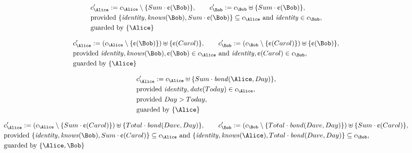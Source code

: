 \begin{align*}
&
c'_
{
\Alice
}
 := 
c_
{
\Alice
}
 \setminus 
\{
Sum
\cdot
\text{\textcent}
(
\Bob
)
\}
, \qquad 
c'_
{
\Bob
}
 := 
c_
{
\Bob
}
 \uplus 
\{
Sum
\cdot
\text{\textcent}
(
\Bob
)
\}
,\\
&
\text{provided } 
\{
\mathit{
identity
}
,
\mathit{
knows
}
(
\Bob
)
,
Sum
\cdot
\text{\textcent}
(
\Bob
)
\}
 \subseteq c_
{
\Alice
}
 \text{ and } 
\mathit{
identity
}
 \in c_
{
\Bob
}
,\\
&
\text{guarded by } \{
\Alice
\}
\end{align*}

\begin{align*}
&
c'_
{
\Alice
}
 := 
(c_
{
\Alice
}
 \setminus 
\{
\text{\textcent}
(
\Bob
)
\}
) \uplus 
\{
\text{\textcent}
(
Carol
)
\}
, \qquad 
c'_
{
\Bob
}
 := 
(c_
{
\Bob
}
 \setminus 
\{
\text{\textcent}
(
Carol
)
\}
) \uplus 
\{
\text{\textcent}
(
\Bob
)
\}
,\\
&
\text{provided } 
\mathit{
identity
}
,
\mathit{
knows
}
(
\Bob
)
,
\text{\textcent}
(
\Bob
)
 \in c_
{
\Alice
}
 \text{ and } 
\mathit{
identity
}
,
\text{\textcent}
(
Carol
)
 \in c_
{
\Bob
}
,\\
&
\text{guarded by } \{
\Alice
\}
\end{align*}

\begin{align*}
&
c'_
{
\Alice
}
 := 
c_
{
\Alice
}
 \uplus 
\{
Sum
\cdot
\mathit{
bond
}
(
\Alice
,
Day
)
\}
,\\
&
\text{provided } 
\mathit{
identity
}
,
\mathit{
date
}
(
Today
)
 \in c_
{
\Alice
}
,\\
&
\text{provided } 
Day
>
Today
,\\
&
\text{guarded by } \{
\Alice
\}
\end{align*}

\begin{align*}
&
c'_
{
\Alice
}
 := 
(c_
{
\Alice
}
 \setminus 
\{
Sum
\cdot
\text{\textcent}
(
Carol
)
\}
) \uplus 
\{
Total
\cdot
\mathit{
bond
}
(
Dave
,
Day
)
\}
, \qquad 
c'_
{
\Bob
}
 := 
(c_
{
\Bob
}
 \setminus 
\{
Total
\cdot
\mathit{
bond
}
(
Dave
,
Day
)
\}
) \uplus 
\{
Sum
\cdot
\text{\textcent}
(
Carol
)
\}
,\\
&
\text{provided } 
\{
\mathit{
identity
}
,
\mathit{
knows
}
(
\Bob
)
,
Sum
\cdot
\text{\textcent}
(
Carol
)
\}
 \subseteq c_
{
\Alice
}
 \text{ and } 
\{
\mathit{
identity
}
,
\mathit{
knows
}
(
\Alice
)
,
Total
\cdot
\mathit{
bond
}
(
Dave
,
Day
)
\}
 \subseteq c_
{
\Bob
}
,\\
&
\text{guarded by } \{
\Alice
,
\Bob
\}
\end{align*}
